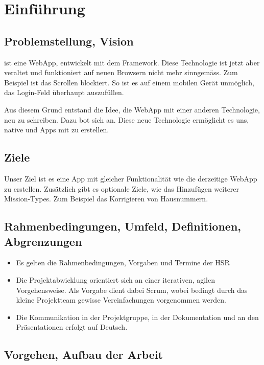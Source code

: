 \chapter{Einführung}
\label{tb-einfuehrung}

\section{Problemstellung, Vision}
\kort{} ist eine \gls{WebApp}, entwickelt mit dem  \gls{Framework}.
Diese Technologie ist jetzt aber veraltet und funktioniert auf neuen Browsern nicht mehr sinngemäss.
Zum Beispiel ist das Scrollen blockiert.
So ist es auf einem mobilen Gerät unmöglich, das Login-Feld überhaupt auszufüllen.

Aus diesem Grund entstand die Idee, die \kort{} \gls{WebApp} mit einer anderen Technologie, neu zu schreiben.
Dazu bot sich  an. 
Diese neue Technologie ermöglicht es uns, native  und  Apps mit  zu erstellen. 


\section{Ziele}
Unser Ziel ist es eine  App mit gleicher Funktionalität wie die derzeitige \gls{WebApp} zu erstellen.
Zusätzlich gibt es optionale Ziele, wie das Hinzufügen weiterer Mission-Types.
Zum Beispiel das Korrigieren von Hausnummern.


\section{Rahmenbedingungen, Umfeld, Definitionen, Abgrenzungen}
\begin{itemize}
\item Es gelten die Rahmenbedingungen, Vorgaben und Termine der HSR
\item Die Projektabwicklung orientiert sich an einer iterativen, agilen Vorgehensweise. Als Vorgabe dient dabei Scrum, wobei bedingt durch das kleine Projektteam gewisse Vereinfachungen vorgenommen werden.
\item Die Kommunikation in der Projektgruppe, in der Dokumentation und an den Präsentationen erfolgt auf Deutsch.
\end{itemize}


\section{Vorgehen, Aufbau der Arbeit}

